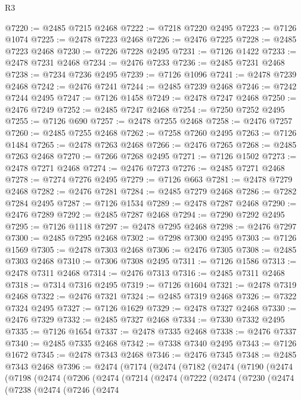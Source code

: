 \begin{lexlean}{R3}
\begin{coremodule}
@7220 := @2485 @7215 @2468
@7222 := @7218 @7220 @2495
@7223 := @7126 @1074
@7225 := @2478 @7223 @2468
@7226 := @2476 @7225
@7228 := @2485 @7223 @2468
@7230 := @7226 @7228 @2495
@7231 := @7126 @1422
@7233 := @2478 @7231 @2468
@7234 := @2476 @7233
@7236 := @2485 @7231 @2468
@7238 := @7234 @7236 @2495
@7239 := @7126 @1096
@7241 := @2478 @7239 @2468
@7242 := @2476 @7241
@7244 := @2485 @7239 @2468
@7246 := @7242 @7244 @2495
@7247 := @7126 @1458
@7249 := @2478 @7247 @2468
@7250 := @2476 @7249
@7252 := @2485 @7247 @2468
@7254 := @7250 @7252 @2495
@7255 := @7126 @690
@7257 := @2478 @7255 @2468
@7258 := @2476 @7257
@7260 := @2485 @7255 @2468
@7262 := @7258 @7260 @2495
@7263 := @7126 @1484
@7265 := @2478 @7263 @2468
@7266 := @2476 @7265
@7268 := @2485 @7263 @2468
@7270 := @7266 @7268 @2495
@7271 := @7126 @1502
@7273 := @2478 @7271 @2468
@7274 := @2476 @7273
@7276 := @2485 @7271 @2468
@7278 := @7274 @7276 @2495
@7279 := @7126 @663
@7281 := @2478 @7279 @2468
@7282 := @2476 @7281
@7284 := @2485 @7279 @2468
@7286 := @7282 @7284 @2495
@7287 := @7126 @1534
@7289 := @2478 @7287 @2468
@7290 := @2476 @7289
@7292 := @2485 @7287 @2468
@7294 := @7290 @7292 @2495
@7295 := @7126 @1118
@7297 := @2478 @7295 @2468
@7298 := @2476 @7297
@7300 := @2485 @7295 @2468
@7302 := @7298 @7300 @2495
@7303 := @7126 @1569
@7305 := @2478 @7303 @2468
@7306 := @2476 @7305
@7308 := @2485 @7303 @2468
@7310 := @7306 @7308 @2495
@7311 := @7126 @1586
@7313 := @2478 @7311 @2468
@7314 := @2476 @7313
@7316 := @2485 @7311 @2468
@7318 := @7314 @7316 @2495
@7319 := @7126 @1604
@7321 := @2478 @7319 @2468
@7322 := @2476 @7321
@7324 := @2485 @7319 @2468
@7326 := @7322 @7324 @2495
@7327 := @7126 @1629
@7329 := @2478 @7327 @2468
@7330 := @2476 @7329
@7332 := @2485 @7327 @2468
@7334 := @7330 @7332 @2495
@7335 := @7126 @1654
@7337 := @2478 @7335 @2468
@7338 := @2476 @7337
@7340 := @2485 @7335 @2468
@7342 := @7338 @7340 @2495
@7343 := @7126 @1672
@7345 := @2478 @7343 @2468
@7346 := @2476 @7345
@7348 := @2485 @7343 @2468
@7396 := @2474
    (@7174
      (@2474
        (@7182
          (@2474
            (@7190
              (@2474
                (@7198
                  (@2474
                    (@7206
                      (@2474
                        (@7214
                          (@2474
                            (@7222
                              (@2474
                                (@7230
                                  (@2474
                                    (@7238
                                      (@2474
                                        (@7246
                                          (@2474

\end{coremodule}
\end{lexlean}
